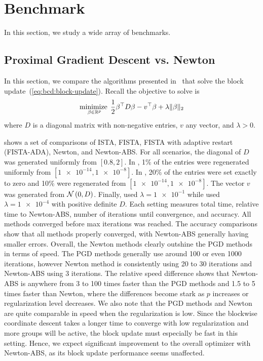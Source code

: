 \section{Benchmark}

In this section, we study a wide array of benchmarks.

\subsection{Proximal Gradient Descent vs. Newton}

In this section, we compare the algorithms presented 
in~
that solve the block update~(\ref{eq:bcd:block-update}).
Recall the objective to solve is
\begin{align*}
    \operatorname*{minimize\;}_{\beta \in \mathbb{R}^p}
    \frac{1}{2} \beta^\top D \beta
    - v^\top \beta
    + \lambda \|\beta\|_2
\end{align*}
where $D$ is a diagonal matrix with non-negative entries,
$v$ any vector, and $\lambda > 0$.

 shows a set of comparisons
of ISTA, FISTA, FISTA with adaptive restart (FISTA-ADA),
Newton, and Newton-ABS.
For all scenarios, the diagonal of $D$ was generated uniformly from $[0.8, 2]$.
In , 1\% of the entries were
regenerated uniformly from $[\num{1e-14}, \num{1e-8}]$.
In , 20\% of the entries were
set exactly to zero and 10\% were regenerated from $[\num{1e-14}, \num{1e-8}]$.
The vector $v$ was generated from $\mathcal{N}\left(0, D\right)$.
Finally, 
used $\lambda=\num{1e-1}$ 
while  used $\lambda=\num{1e-4}$
with positive definite $D$.
Each setting measures total time, relative time to Newton-ABS,
number of iterations until convergence, and accuracy.
All methods converged before max iterations was reached.
The accuracy comparisons show that all methods properly converged,
with Newton-ABS generally having smaller errors.
Overall, the Newton methods clearly outshine the PGD methods in terms of speed.
The PGD methods generally use around 100 or even 1000 iterations,
however Newton method is consistently using 20 to 30 iterations
and Newton-ABS using 3 iterations.
The relative speed difference shows that Newton-ABS is anywhere from 3 to 100 times faster
than the PGD methods and 1.5 to 5 times faster than Newton,
where the differences become stark as $p$ increases or regularization level decreases.
We also note that the PGD methods and Newton are quite comparable in speed
when the regularization is low. 
Since the blockwise coordinate descent takes a longer time to converge with low regularization
and more groups will be active, the block update must especially be fast in this setting.
Hence, we expect significant improvement to the overall optimizer with Newton-ABS,
as its block update performance seems unaffected.

